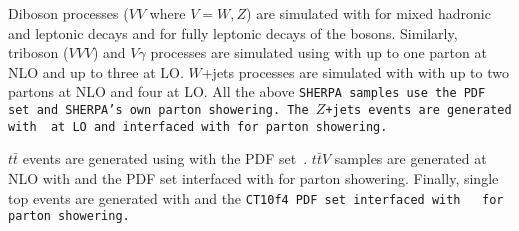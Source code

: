 Diboson processes ($VV$ where $V = W,Z$) are simulated with  for mixed hadronic and leptonic decays and  for fully leptonic decays of the bosons.
Similarly, triboson ($VVV$) and $V\gamma$ processes are simulated using  with up to one parton at NLO and up to three at LO.
$W$+jets processes are simulated with  with up to two partons at NLO and four at LO.
All the above \tt{SHERPA} samples use the \nnpdf PDF set and \tt{SHERPA}'s own parton showering.
The $Z$+jets events are generated with \mcatnlo\cite{2014.madgraph_mcnlo} at LO and interfaced with  for parton showering.

$t\bar{t}$ events are generated using  with the \ctten PDF set~\cite{2010.ct10}.
$t\bar{t}V$ samples are generated at NLO with \mcatnlo and the \nnpdf PDF set interfaced with  for parton showering.
Finally, single top events are generated with  and the \tt{CT10f4} PDF set interfaced with ~\cite{2006.Pythia6} for parton showering.

\begin{table}
  \centering
  \caption{Summary of MC samples used in the analysis.}
  \label{tab:ssww13tev_mcsamples}
\end{table}
